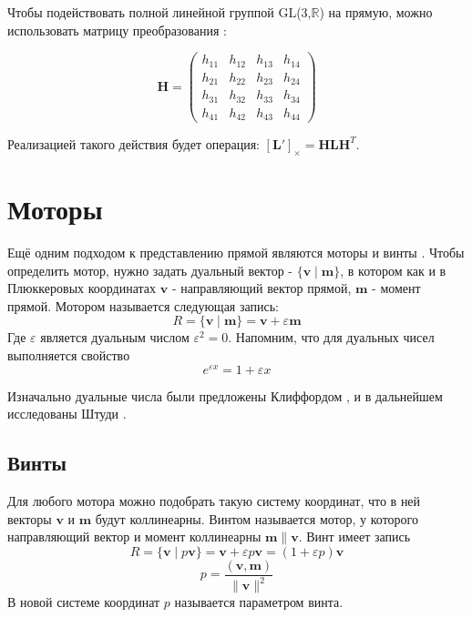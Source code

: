   Чтобы подействовать полной линейной группой  GL(3,$\mathbb{R}$) на прямую, можно использовать матрицу преобразования 
  \autocite[Гл. 3.2, секция II. Plücker matrices, пункт 5]{hartley2003multiple}: 

  \begin{equation*}
    \mathbf{H} =
    \begin{pmatrix}
      h_{11} & h_{12} & h_{13} & h_{14} \\
      h_{21} & h_{22} & h_{23} & h_{24} \\
      h_{31} & h_{32} & h_{33} & h_{34} \\
      h_{41} & h_{42} & h_{43} & h_{44} 
  \end{pmatrix}
  \end{equation*}

  Реализацией такого действия будет операция: $[\mathbf{L}']_\times = \mathbf{HLH}^T$.

  \section{Моторы}

  Ещё одним подходом к представлению прямой являются моторы и винты \autocite{dimentberg1965винтовое}. Чтобы определить мотор, нужно задать дуальный вектор
  - $\{\mathbf{v} \mid \mathbf{m}\}$, в котором как и в Плюккеровых координатах $\mathbf{v}$ - направляющий вектор прямой, $\mathbf{m}$ - момент прямой.
  Мотором называется следующая запись: 
  \begin{equation*}
    R = \{ \mathbf{v} \mid \mathbf{m} \} = \mathbf{v} + \varepsilon \mathbf{m}
  \end{equation*}
  Где $\varepsilon$ является дуальным числом $\varepsilon^2=0$. Напомним, что для дуальных чисел выполняется свойство
  \begin{equation*}
    e^{\varepsilon x} = 1 + \varepsilon x
  \end{equation*}

  Изначально дуальные числа были предложены Клиффордом \autocite{cliffordPreliminarySketchBiquaternions1871},
  и в дальнейшем исследованы Штуди \autocite{zindlerGeometrieDynamenStudy1903}.

  \subsection{Винты}

  Для любого мотора можно подобрать такую систему координат, что в ней векторы $\mathbf{v}$ и $\mathbf{m}$ будут коллинеарны. 
  Винтом называется мотор, у которого направляющий вектор и момент коллинеарны $\mathbf{m} \| \mathbf{v}$. Винт имеет запись
  \begin{equation*}
    R = \{ \mathbf{v} \mid p\mathbf{v} \} = \mathbf{v} + \varepsilon p \mathbf{v} = (1+\varepsilon p)\mathbf{v}
  \end{equation*}
  \begin{equation*}
    p=\frac{(\mathbf{v}, \mathbf{m})}{\| \mathbf{v} \|^2}
  \end{equation*}
  В новой системе координат $p$ называется параметром винта.

